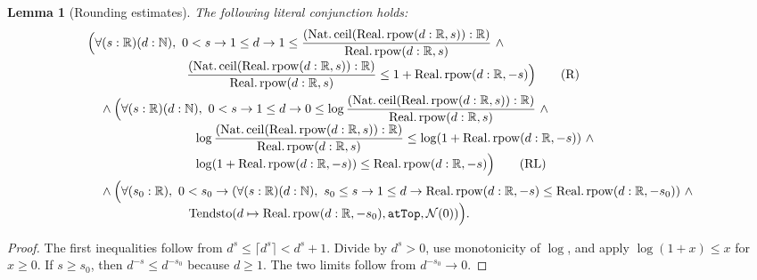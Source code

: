 \documentclass[9pt]{extarticle}
\newtheorem{lemma}{Lemma}[section]
\theoremstyle{definition}
\theoremstyle{remark}
\newcommand{\R}{\mathbb R}
\newcommand{\N}{\mathbb N}
\begin{document}
\begin{lemma}[Rounding estimates]\label{lem:rounding}
The following literal conjunction holds:
\begin{align*}
&\Bigl(\forall(s:\R)(d:\N),\ 0<s\to1\leq d\to
  1\leq
  \frac{(\operatorname{Nat.ceil}
    (\operatorname{Real.rpow}(d:\R,s)):\R)}
       {\operatorname{Real.rpow}(d:\R,s)}\ \wedge\\[-2pt]
&\hspace{28mm}
  \frac{(\operatorname{Nat.ceil}
    (\operatorname{Real.rpow}(d:\R,s)):\R)}
       {\operatorname{Real.rpow}(d:\R,s)}
  \leq1+\operatorname{Real.rpow}(d:\R,-s)\Bigr)
 \tag{R}\label{eq:rounding-estimate}\\
&\quad\wedge\Bigl(\forall(s:\R)(d:\N),\ 0<s\to1\leq d\to
  0\leq\log
  \frac{(\operatorname{Nat.ceil}
    (\operatorname{Real.rpow}(d:\R,s)):\R)}
       {\operatorname{Real.rpow}(d:\R,s)}\ 
  \wedge\\[-4pt]
&\hspace{30mm}
  \log
  \frac{(\operatorname{Nat.ceil}
    (\operatorname{Real.rpow}(d:\R,s)):\R)}
       {\operatorname{Real.rpow}(d:\R,s)}
  \leq\log(1+\operatorname{Real.rpow}(d:\R,-s))\ 
  \wedge\\[-4pt]
&\hspace{30mm}
  \log(1+\operatorname{Real.rpow}(d:\R,-s))
  \leq\operatorname{Real.rpow}(d:\R,-s)\Bigr)
 \tag{RL}\label{eq:rounding-log-estimate}\\
&\quad\wedge\Bigl(\forall(s_0:\R),\ 0<s_0\to
  (\forall(s:\R)(d:\N),\ s_0\leq s\to1\leq d\to
   \operatorname{Real.rpow}(d:\R,-s)
   \leq\operatorname{Real.rpow}(d:\R,-s_0))\ 
  \wedge\\[-4pt]
&\hspace{28mm}
  \operatorname{Tendsto}
   (d\mapsto\operatorname{Real.rpow}(d:\R,-s_0),
    \texttt{atTop},\mathcal N(0))\Bigr).
\end{align*}
\end{lemma}

\begin{proof}
The first inequalities follow from
$d^s\leq\lceil d^s\rceil<d^s+1$. Divide by $d^s>0$, use monotonicity of
$\log$, and apply $\log(1+x)\leq x$ for $x\geq0$. If $s\geq s_0$, then
$d^{-s}\leq d^{-s_0}$ because $d\geq1$. The two limits follow from
$d^{-s_0}\to0$.
\end{proof}
\end{document}
